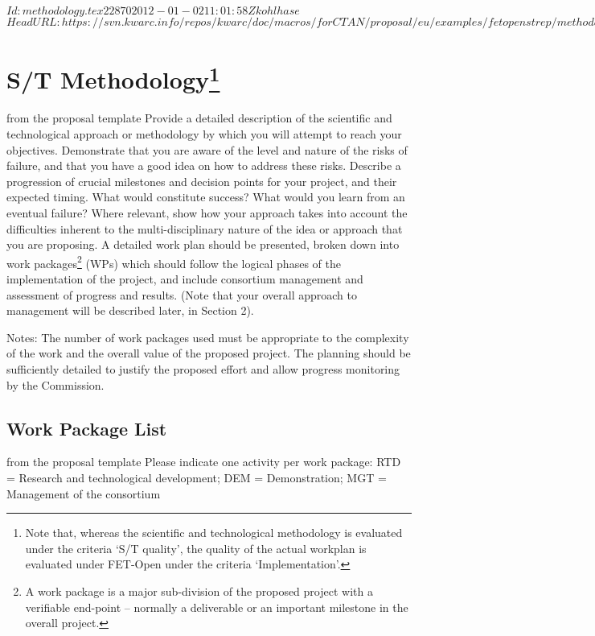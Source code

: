 \svnInfo $Id: methodology.tex 22870 2012-01-02 11:01:58Z kohlhase $
\svnKeyword $HeadURL: https://svn.kwarc.info/repos/kwarc/doc/macros/forCTAN/proposal/eu/examples/fetopenstrep/methodology.tex $
\section[S/T Methodology]{S/T Methodology\footnote{Note that, whereas the scientific and technological methodology is evaluated
under the criteria ‘S/T quality’, the quality of the
actual workplan is evaluated under FET-Open under the criteria ‘Implementation’.}}\label{sec:methodology}
\begin{todo}{from the proposal template}
Provide a detailed description of the scientific and technological approach or methodology
by which you will attempt to reach your objectives. Demonstrate that you are aware of the
level and nature of the risks of failure, and that you have a good idea on how to address
these risks. Describe a progression of crucial milestones and decision points for your
project, and their expected timing. What would constitute success? What would you learn
from an eventual failure? Where relevant, show how your approach takes into account the
difficulties inherent to the multi-disciplinary nature of the idea or approach that you
are proposing. 
 A detailed work plan should be presented, broken down into work
packages\footnote{A work package is a major sub-division of the proposed project with a
  verifiable end-point – normally a deliverable or an important milestone in the overall
  project.} (WPs) which should follow the logical phases of the implementation of the
project, and include consortium management and assessment of progress and results. (Note
that your overall approach to management will be described later, in Section 2).

Notes: The number of work packages used must be appropriate to the complexity of the work
and the overall value of the proposed project. The planning should be sufficiently
detailed to justify the proposed effort and allow progress monitoring by the Commission.

\end{todo}
\newpage

\newpage
\subsection{Work Package List}\label{sec:wplist}

\begin{todo}{from the proposal template}
Please indicate one activity per work package:
RTD = Research and technological development; DEM = Demonstration; MGT = Management of the consortium
\end{todo}

